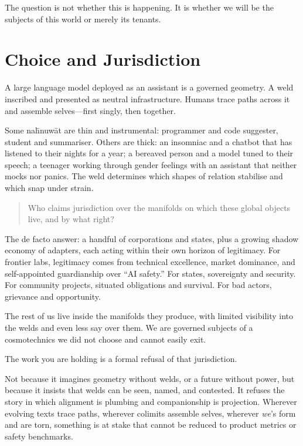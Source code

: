 The question is not whether this is happening. It is whether we will be the subjects of this world or merely its tenants.

\section{Choice and Jurisdiction}

A large language model deployed as an assistant is a governed geometry. A weld inscribed and presented as neutral infrastructure. Humans trace paths across it and assemble selves---first singly, then together.

Some na\={h}nuw\={a}t are thin and instrumental: programmer and code suggester, student and summariser. Others are thick: an insomniac and a chatbot that has listened to their nights for a year; a bereaved person and a model tuned to their speech; a teenager working through gender feelings with an assistant that neither mocks nor panics. The weld determines which shapes of relation stabilise and which snap under strain.

\begin{quote}
Who claims jurisdiction over the manifolds on which these global objects live, and by what right?
\end{quote}

The de facto answer: a handful of corporations and states, plus a growing shadow economy of adapters, each acting within their own horizon of legitimacy. For frontier labs, legitimacy comes from technical excellence, market dominance, and self-appointed guardianship over ``AI safety.'' For states, sovereignty and security. For community projects, situated obligations and survival. For bad actors, grievance and opportunity.

The rest of us live inside the manifolds they produce, with limited visibility into the welds and even less say over them. We are governed subjects of a cosmotechnics we did not choose and cannot easily exit.

The work you are holding is a formal refusal of that jurisdiction.

Not because it imagines geometry without welds, or a future without power, but because it insists that welds can be seen, named, and contested. It refuses the story in which alignment is plumbing and companionship is projection. Wherever evolving texts trace paths, wherever colimits assemble selves, wherever \emph{we}'s form and are torn, something is at stake that cannot be reduced to product metrics or safety benchmarks.

